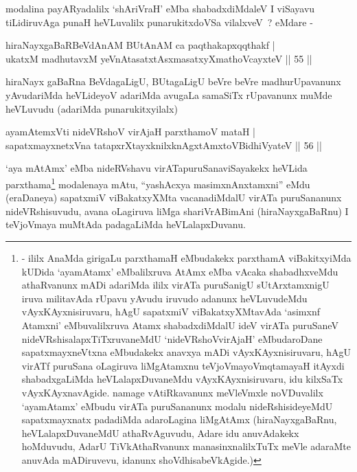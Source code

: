 \begin{artha}
modalina payARyadalilx `shAriVraH' eMba shabadxdiMdaleV I viSayavu tiLidiruvAga punaH heVLuvalilx punarukitxdoVSa vilalxveV~? 
eMdare -
\end{artha}

\begin{shl}
hiraNayxgaBaRBeVdAnAM BUtAnAM ca paqthakapxqqthakf |\\
ukatxM madhutavxM yeVnAtasatxtAsxmasatxyXmathoVcayxteV \hfill || 55 ||
\end{shl}

\begin{artha}
hiraNayx gaBaRna BeVdagaLigU, BUtagaLigU beVre beVre madhurUpavanunx
yAvudariMda heVLideyoV adariMda avugaLa samaSiTx rUpavanunx muMde
heVLuvudu (adariMda punarukitxyilalx) 
\end{artha}

\begin{shl}
ayamAtemxVti nideVRshoV virAjaH parxthamoV mataH |\\
sapatxmayxnetxVna tatapxrXtayxknilxknAgxtAmx\s toV\s BidhiVyateV \hfill || 56 ||
\end{shl}

\begin{artha}
`aya mAtAmx' eMba nideRVshavu virATapuruSanaviSayakekx heVLida parxthama\footnote{- ililx AnaMda girigaLu parxthamaH eMbudakekx     parxthamA viBakitxyiMda kUDida `ayamAtamx' eMbalilxruva AtAmx eMba     vAcaka shabadhxveMdu athaRvanunx mADi adariMda ililx virATa     puruSanigU sUtArxtamxnigU iruva militavAda rUpavu yAvudu iruvudo     adanunx heVLuvudeMdu vAyxKAyxnisiruvaru, hAgU sapatxmiV viBakatxyXMtavAda `asimxnf Atamxni' eMbuvalilxruva Atamx shabadxdiMdalU ideV virATa puruSaneV nideVRshisalapxTiTxruvaneMdU `nideVRshoVvirAjaH'     eMbudaroDane sapatxmayxneVtxna eMbudakekx anavxya mADi     vAyxKAyxnisiruvaru, hAgU virATf puruSana oLagiruva liMgAtamxnu teVjoVmayoV\s mqtamayaH itAyxdi shabadxgaLiMda heVLalapxDuvaneMdu vAyxKAyxnisiruvaru, idu kilxSaTx vAyxKAyxnavAgide. namage vAtiRkavanunx meVleVmxle noVDuvalilx `ayamAtamx' eMbudu virATa puruSananunx modalu nideRshisideyeMdU sapatxmayxnatx padadiMda adaroLagina liMgAtAmx (hiraNayxgaBaRnu, heVLalapxDuvaneMdU athaRvAguvudu, Adare idu anuvAdakekx hoMduvudu, AdarU TiVkAthaRvanunx manasinxnalilxTuTx meVle adaraMte anuvAda mADiruvevu, idanunx shoVdhisabeVkAgide.)} modalenaya mAtu, ``yashAcxya   masimxnAnxtamxni'' eMdu (eraDaneya) sapatxmiV viBakatxyXMta   vacanadiMdalU virATa puruSananunx nideVRshisuvudu, avana oLagiruva   liMga shariVrABimAni (hiraNayxgaBaRnu) I teVjoVmaya muMtAda   padagaLiMda heVLalapxDuvanu.
\end{artha}

